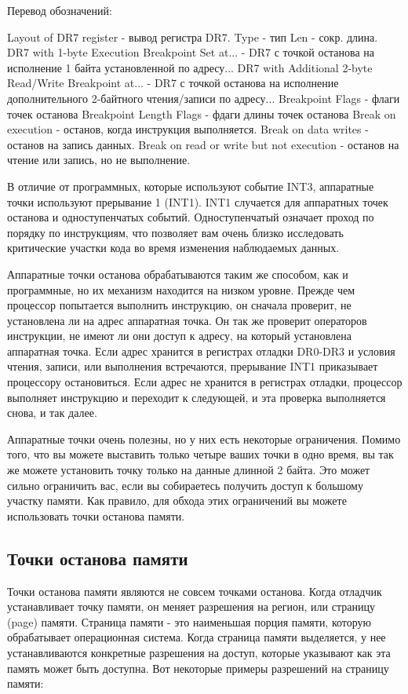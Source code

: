 \documentclass[12pt]{book}
\begin{document}
Перевод обозначений:

    Layout of DR7 register - вывод регистра DR7.
    Type - тип
    Len - сокр. длина.
    DR7 with 1-byte Execution Breakpoint Set at... - DR7 с точкой останова на исполнение 1 байта установленной по адресу...
    DR7 with Additional 2-byte Read/Write Breakpoint at... - DR7 с точкой останова на исполнение дополнительного 2-байтного чтения/записи по адресу...
    Breakpoint Flags - флаги точек останова
    Breakpoint Length Flags - фдаги длины точек останова
    Break on execution - останов, когда инструкция выполняется.
    Break on data writes - останов на запись данных.
    Break on read or write but not execution - останов на чтение или запись, но не выполнение.


В отличие от программных, которые используют событие INT3, аппаратные точки используют прерывание 1 (INT1). INT1 случается для аппаратных точек останова и одноступенчатых событий. Одноступенчатый означает проход по порядку по инструкциям, что позволяет вам очень близко исследовать критические участки кода во время изменения наблюдаемых данных.

Аппаратные точки останова обрабатываются таким же способом, как и программные, но их механизм находится на низком уровне. Прежде чем процессор попытается выполнить инструкцию, он сначала проверит, не установлена ли на адрес аппаратная точка. Он так же проверит операторов инструкции, не имеют ли они доступ к адресу, на который установлена аппаратная точка. Если адрес хранится в регистрах отладки DR0-DR3 и условия чтения, записи, или выполнения встречаются, прерывание INT1 приказывает процессору остановиться. Если адрес не хранится в регистрах отладки, процессор выполняет инструкцию и переходит к следующей, и эта проверка выполняется снова, и так далее.

Аппаратные точки очень полезны, но у них есть некоторые ограничения. Помимо того, что вы можете выставить только четыре ваших точки в одно время, вы так же можете установить точку только на данные длинной 2 байта. Это может сильно ограничить вас, если вы собираетесь получить доступ к большому участку памяти. Как правило, для обхода этих ограничений вы можете использовать точки останова памяти.

\subsection{Точки останова памяти}

Точки останова памяти являются не совсем точками останова. Когда отладчик устанавливает точку памяти, он меняет разрешения на регион, или страницу (page) памяти. Страница памяти - это наименьшая порция памяти, которую обрабатывает операционная система. Когда страница памяти выделяется, у нее устанавливаются конкретные разрешения на доступ, которые указывают как эта память может быть доступна. Вот некоторые примеры разрешений на страницу памяти:
\end{document}
